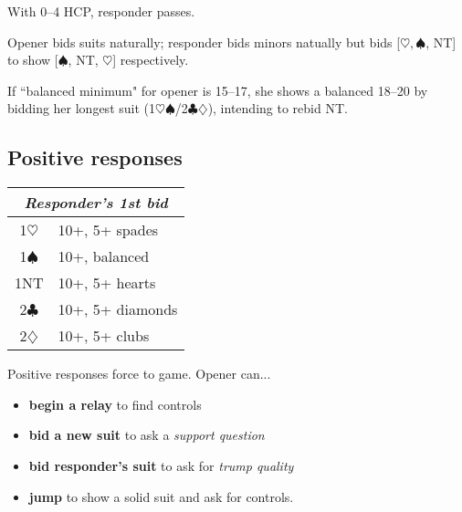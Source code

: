 \documentclass[a4paper, twoside, 11pt]{article}
\begin{document}
\begin{multicols}{3}
\begin{center}
\begin{tabular}{ |c|l| }
 \hline
\end{tabular}
\end{center}

With 0--4 HCP, responder passes.

Opener bids suits naturally; responder bids minors natually but bids [$\heartsuit, \spadesuit$, NT] to show [$\spadesuit$, NT, $\heartsuit$] respectively.

If ``balanced minimum" for opener is 15--17, she shows a balanced 18--20 by bidding her longest suit (1$\heartsuit\spadesuit$/2$\clubsuit\diamondsuit$), intending to rebid NT.





\subsection*{Positive responses}

\begin{center}
\begin{tabular}{ |c|l| }
 \hline
 \multicolumn{2}{|c|}{\textit{Responder's 1st bid}} \\
 \hline
 1$\heartsuit$ & 10+, 5+ spades\\
 1$\spadesuit$ & 10+,  balanced\\
 1NT& 10+, 5+ hearts\\
 2$\clubsuit$ & 10+, 5+ diamonds\\
 2$\diamondsuit$ & 10+, 5+ clubs\\
 \hline
\end{tabular}
\end{center}
 Positive responses force to game. Opener can...
 \begin{itemize}
     \item \textbf{begin a relay} to find controls
     \item \textbf{bid a new suit} to ask a \textit{support question}
     \item \textbf{bid responder's suit} to ask for \textit{trump quality}
     \item \textbf{jump} to show a solid suit and ask for controls.
 \end{itemize}


\end{multicols}
\end{document}

